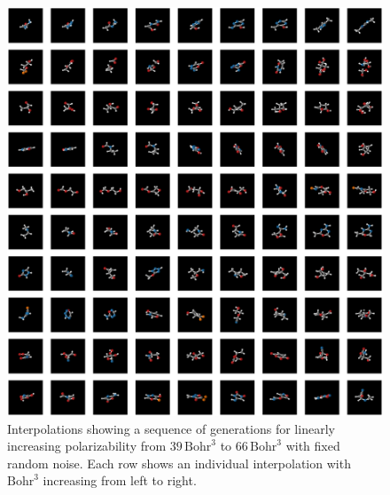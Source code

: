 \begin{figure}
    \centering
    \includegraphics[width=\textwidth]{figs/tddm/interp_bright.png}
    \caption{Interpolations showing a sequence of generations for linearly increasing polarizability from $39 \, \text{Bohr}^3$ to $66 \, \text{Bohr}^3$ with fixed random noise. Each row shows an individual interpolation with $\text{Bohr}^3$ increasing from left to right.}
    \label{fig:tddm-apdxMoreInterps}
\end{figure}

